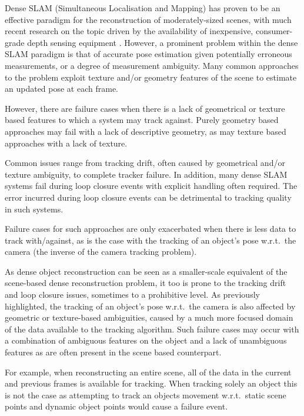 Dense SLAM (Simultaneous Localisation and Mapping) has proven to be an effective paradigm for the reconstruction of moderately-sized scenes,
with much recent research on the topic driven by the availability of inexpensive, consumer-grade depth sensing equipment \cite{Newcombe2011,Niessner2013,Prisacariu2014}. 
However, a prominent problem within the dense SLAM paradigm is that of accurate pose estimation given potentially erroneous measurements, or a degree of measurement ambiguity. Many common approaches to the problem exploit texture and/or geometry features of the scene to estimate 
an updated pose at each frame.

However, there are failure cases when there is a lack of geometrical or texture based features to which a system may track against. Purely geometry 
based approaches may fail with a lack of descriptive geometry, as may texture based approaches with a lack of texture. 

Common issues range from tracking drift, often caused by geometrical and/or texture ambiguity, to complete tracker failure. In addition, many dense 
SLAM systems fail during loop closure events with explicit handling often required. The error incurred during loop closure events can be detrimental 
to tracking quality in such systems. 

Failure cases for such approaches are only exacerbated when there is less data to track with/against, as is the case with the tracking of an 
object's pose w.r.t.\ the camera (the inverse of the camera tracking problem).

As dense object reconstruction can be seen as a smaller-scale equivalent of the scene-based dense reconstruction problem, it too is prone to the
tracking drift and loop closure issues, sometimes to a prohibitive level. As previously highlighted, the tracking of an object's pose w.r.t.\ the camera 
is also affected by geometric or texture-based ambiguities, caused by a much more focused domain of the data available to the tracking algorithm. 
Such failure cases may occur with a combination of ambiguous features on the object and a lack of unambiguous features as are often present 
in the scene based counterpart.

For example, when reconstructing an entire scene, all of the data in the current and previous frames is available for tracking. When tracking solely an object this is not the case as attempting to track an objects movement w.r.t.\ static scene points and dynamic object points would cause a failure 
event.

